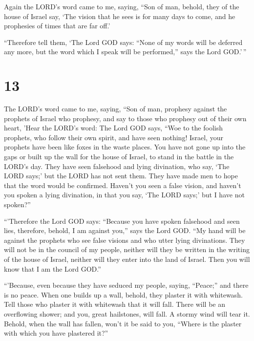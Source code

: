  Again the LORD's word came to me, saying,
 ``Son of man, behold, they of the house of Israel say,
`The vision that he sees is for many days to come, and he prophesies of
times that are far off.'

 ``Therefore tell them, `The Lord GOD says: ``None of my
words will be deferred any more, but the word which I speak will be
performed,'' says the Lord GOD.'\,''

\hypertarget{section-11}{%
\section{13}\label{section-11}}

 The LORD's word came to me, saying,  ``Son
of man, prophesy against the prophets of Israel who prophesy, and say to
those who prophesy out of their own heart, 'Hear the LORD's word:
 The Lord GOD says, ``Woe to the foolish prophets, who
follow their own spirit, and have seen nothing!  Israel,
your prophets have been like foxes in the waste places. 
You have not gone up into the gaps or built up the wall for the house of
Israel, to stand in the battle in the LORD's day.  They
have seen falsehood and lying divination, who say, `The LORD says;' but
the LORD has not sent them. They have made men to hope that the word
would be confirmed.  Haven't you seen a false vision, and
haven't you spoken a lying divination, in that you say, `The LORD says;'
but I have not spoken?''

 ``'Therefore the Lord GOD says: ``Because you have spoken
falsehood and seen lies, therefore, behold, I am against you,'' says the
Lord GOD.  ``My hand will be against the prophets who see
false visions and who utter lying divinations. They will not be in the
council of my people, neither will they be written in the writing of the
house of Israel, neither will they enter into the land of Israel. Then
you will know that I am the Lord GOD.''

 ``'Because, even because they have seduced my people,
saying, ``Peace;'' and there is no peace. When one builds up a wall,
behold, they plaster it with whitewash.  Tell those who
plaster it with whitewash that it will fall. There will be an
overflowing shower; and you, great hailstones, will fall. A stormy wind
will tear it.  Behold, when the wall has fallen, won't it
be said to you, ``Where is the plaster with which you have plastered
it?''

